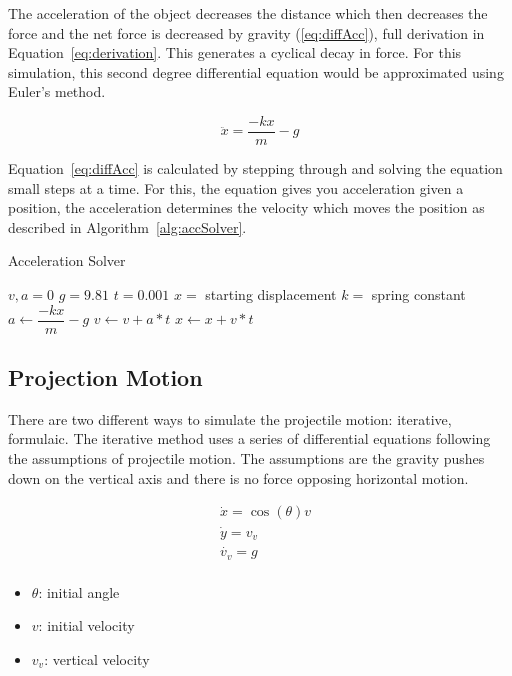 \documentclass[12pt, letterpaper]{article}
\begin{document}
The acceleration of the object decreases the distance which then decreases the force and the net force is
decreased by gravity (\ref{eq:diffAcc}), full derivation in Equation~\ref{eq:derivation}. This generates a 
cyclical decay in force. For this simulation, this second degree differential equation would be approximated 
using Euler's method.

\begin{equation}
  \label{eq:diffAcc}
  \ddot{x} = \frac{-kx}{m} -g
\end{equation}

Equation~\ref{eq:diffAcc} is calculated by stepping through and solving the equation small steps at a time.
For this, the equation gives you acceleration given a position, the acceleration determines the velocity
which moves the position as described in Algorithm~\ref{alg:accSolver}.

\begin{algorithm}
\caption{Acceleration Solver}
\begin{algorithmic} 
\label{alg:accSolver}
\REQUIRE $v, a = 0$
\REQUIRE $g = 9.81$
\REQUIRE $t = 0.001$
\REQUIRE $x =$ starting displacement
\REQUIRE $k =$ spring constant
\STATE $a \leftarrow \dfrac{-kx}{m} - g$
\STATE $v \leftarrow v + a * t$
\STATE $x \leftarrow x + v * t$
\ENDWHILE
\end{algorithmic}
\end{algorithm}

\subsection{Projection Motion} \label{sec:ProjectileMotion}
There are two different ways to simulate the projectile motion: iterative, formulaic. The iterative method
uses a series of differential equations following the assumptions of projectile motion. The assumptions are
the gravity pushes down on the vertical axis and there is no force opposing horizontal motion.

\begin{singlespace}
  \begin{equation}
    \begin{split}
      &\dot{x} = \cos(\theta) v \\
      &\dot{y} = v_v \\
      &\dot{v_v} = g \\
    \end{split}
  \end{equation}
  \begin{small}
    \begin{itemize}[label=]
      \item $\theta$: initial angle
      \item $v$: initial velocity
      \item $v_v$: vertical velocity
    \end{itemize}
  \end{small}
\end{singlespace}
\end{document}
